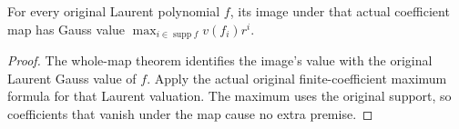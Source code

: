 \begin{corollary}\label{cor:laurent-gauss-original-coefficient-maximum}
\leanok
{}
For every original Laurent polynomial $f$, its image under that actual
coefficient map has Gauss value
$\max_{i\in\operatorname{supp}f}v(f_i)r^i$.
\end{corollary}
\begin{proof}
The whole-map theorem identifies the image's value with the original
Laurent Gauss value of $f$. Apply the actual original finite-coefficient
maximum formula for that Laurent valuation. The maximum uses the original
support, so coefficients that vanish under the map cause no extra premise.
\end{proof}
